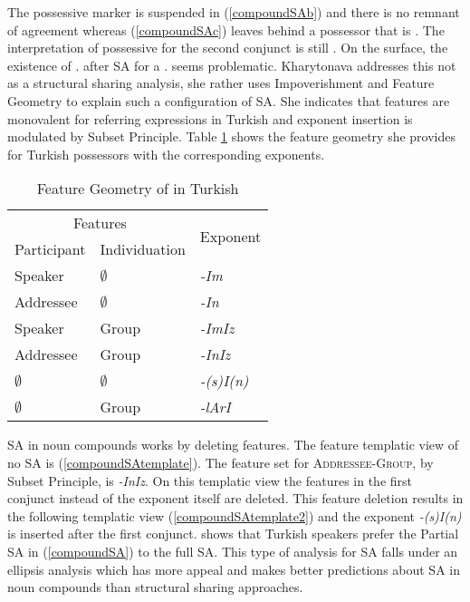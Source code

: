The possessive marker is suspended in (\ref{compoundSAb}) and there is no remnant of agreement whereas (\ref{compoundSAc}) leaves behind a possessor that is {\Tsg}. The interpretation of possessive for the second conjunct is still {\Ssg}. On the surface, the existence of {\Poss}.{\Tsg} after SA for a {\Poss}.{\Ssg} seems problematic. Kharytonava addresses this not as a structural sharing analysis, she rather uses Impoverishment and Feature Geometry to explain such a configuration of SA. She indicates that features are monovalent for referring expressions in Turkish and exponent insertion is modulated by Subset Principle. Table \ref{tab:kharyfeatures} shows the feature geometry she provides for Turkish possessors with the corresponding exponents.

\begin{table}[hbt!]
    \caption{Feature Geometry of {\Poss} in Turkish}
    \centering
    \begin{tabular}{|l|l|l|}
    \hline
         \multicolumn{2}{|c|}{Features} & \multirow{2}{*}{Exponent}  \\ \cline{1-2}
         Participant & Individuation  & \\ \hline
         Speaker & $\emptyset$ & \textit{-Im} \\ \hline 
         Addressee & $\emptyset$ & \textit{-In} \\ \hline 
         Speaker & Group & \textit{-ImIz} \\ \hline 
         Addressee & Group & \textit{-InIz} \\ \hline 
         $\emptyset$ & $\emptyset$ & \textit{-(s)I(n)} \\ \hline 
         $\emptyset$ & Group & \textit{-lArI} \\ \hline 
    \end{tabular}
    \label{tab:kharyfeatures}
\end{table}

SA in noun compounds works by deleting features. The feature templatic view of no SA is (\ref{compoundSAtemplate}). The feature set for \textsc{Addressee}-\textsc{Group}, by Subset Principle, is \textit{-InIz}. On this templatic view the features in the first conjunct instead of the exponent itself are deleted. This feature deletion results in the following templatic view (\ref{compoundSAtemplate2}) and the exponent \textit{-(s)I(n)} is inserted after the first conjunct. \citet{kharytonava2011morphology} shows that Turkish speakers prefer the Partial SA in (\ref{compoundSA}) to the full SA. This type of analysis for SA falls under an ellipsis analysis which has more appeal and makes better predictions about SA in noun compounds than structural sharing approaches.

